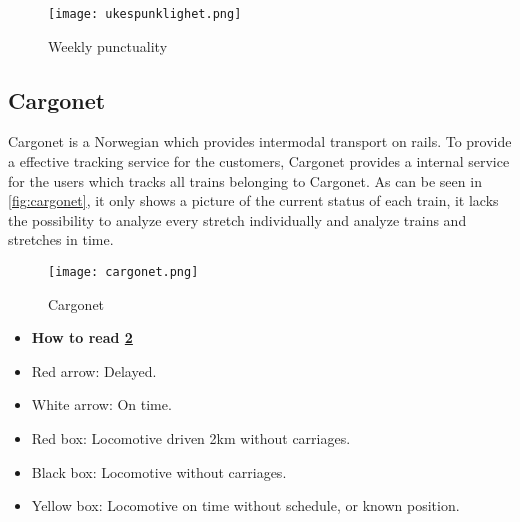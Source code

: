 \begin{figure}[!htbp]
	\texttt{[image: ukespunklighet.png]}
	\caption[Weekly punctuality]{Weekly punctuality\cite{sintefPresis}}
	\label{fig:ukespunklighet}
\end{figure}
\pagebreak

\clearpage
\subsection{Cargonet} %
\label{sub:subsection_cargonet}

Cargonet is a Norwegian which provides intermodal transport on rails. To 
provide a effective tracking service for the customers, Cargonet provides a 
internal service for the users which tracks all trains belonging to Cargonet.
As can be seen in \vref{fig:cargonet}, it only shows a picture of the current
status of each train, it lacks the possibility to analyze every stretch 
individually  and analyze trains and stretches in time.

\begin{figure}[!htbp]
	\texttt{[image: cargonet.png]}
	\caption[Cargonet]{Cargonet \cite{cargonet}}
	\label{fig:cargonet}
\end{figure}

\begin{itemize}
	\item [] \textbf{How to read \ref{fig:cargonet}}
	\item Red arrow:\hspace{4ex} Delayed.
	\item White arrow:\hspace{4ex} On time.
	\item Red box:\hspace{4ex} Locomotive driven 2km without carriages.
	\item Black box:\hspace{4ex} Locomotive without carriages.
	\item Yellow box:\hspace{4ex} Locomotive on time without schedule, or known position.
\end{itemize}

\pagebreak
